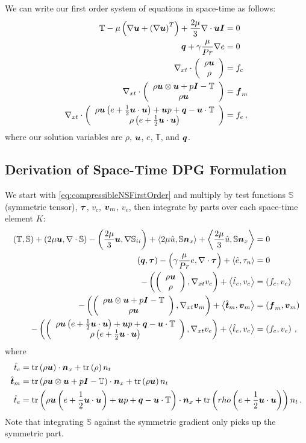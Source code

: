\documentclass[Proposal.tex]{subfiles}
\begin{document}
We can write our first order system of equations in space-time as follows:
\begin{subequations}
\label{eq:compressibleNSFirstOrder}
\begin{align}
	\mathbb{T}-\mu\LRp{\Grad\bfu+\LRp{\Grad\bfu}^T}+\frac{2\mu}{3}\Div\bfu\bfI&=0\\
	\bfq+\gamma\frac{\mu}{Pr}\Grad e&=0\\
	\Divxt\vecttwo{\rho\bfu}{\rho}&=f_c\\
	\Divxt\vecttwo{\rho\bfu\otimes\bfu+p\bfI-\mathbb{T}}{\rho\bfu}&=\bff_m\\
	\Divxt\vecttwo{\rho\bfu\LRp{e+\frac{1}{2}\bfu\cdot\bfu}+\bfu p+\bfq-\bfu\cdot\mathbb{T}}{\rho\LRp{e+\frac{1}{2}\bfu\cdot\bfu}}&=f_e\,,
\end{align}
\end{subequations}
where our solution variables are $\rho$, $\bfu$, $e$, $\mathbb{T}$, and $\bfq$.

\subsection{Derivation of Space-Time DPG Formulation}
We start with \eqref{eq:compressibleNSFirstOrder} and multiply by test functions $\mathbb{S}$ (symmetric tensor), $\bftau$, $v_c$, $\bfv_m$, $v_e$, 
then integrate by parts over each space-time element $K$:
\begin{subequations}
\label{eq:compressibleNSBF}
\begin{align}
	\LRp{\mathbb{T},\mathbb{S}}+\LRp{2\mu\bfu,\Div\mathbb{S}}-\LRp{\frac{2\mu}{3}\bfu,\Grad\mathbb{S}_{ii}}
	+\LRa{2\mu\hat u,\mathbb{S}\bfn_x}+\LRa{\frac{2\mu}{3}\hat u,\mathbb{S}\bfn_x}&=0\\
	\LRp{\bfq,\bftau}-\LRp{\gamma\frac{\mu}{Pr}e,\Div\bftau}+\LRa{\hat e,\tau_n}&=0\\
	-\LRp{\vecttwo{\rho\bfu}{\rho},\Gradxt v_c}+\LRa{\hat t_c,v_c}&=\LRp{f_c,v_c}\\
	-\LRp{\vecttwo{\rho\bfu\otimes\bfu+p\bfI-\mathbb{T}}{\rho\bfu},\Gradxt\bfv_m}+\LRa{\hat\bft_m,\bfv_m}&=\LRp{\bff_m,\bfv_m}\\
	-\LRp{\vecttwo{\rho\bfu\LRp{e+\frac{1}{2}\bfu\cdot\bfu}+\bfu p+\bfq-\bfu\cdot\mathbb{T}}{\rho\LRp{e+\frac{1}{2}\bfu\cdot\bfu}},\Gradxt v_e}
	+\LRa{\hat t_e,v_e}&=\LRp{f_e,v_e}\,,
\end{align}
\end{subequations}
where 
\begin{equation*}
\begin{aligned}
\hat t_c&=\trace\LRp{\rho\bfu}\cdot\bfn_x
+\trace\LRp{\rho}n_t\\
\hat\bft_m&=\trace\LRp{\rho\bfu\otimes\bfu+p\bfI-\mathbb{T}}\cdot\bfn_x
+\trace\LRp{\rho\bfu} n_t\\
\hat t_e&=\trace\LRp{\rho\bfu\LRp{e+\frac{1}{2}\bfu\cdot\bfu}+\bfu p+\bfq-\bfu\cdot\mathbb{T}}\cdot\bfn_x
+\trace\LRp{rho\LRp{e+\frac{1}{2}\bfu\cdot\bfu}}n_t\,.
\end{aligned}
\end{equation*}
Note that integrating $\mathbb{S}$ against the symmetric gradient only picks up the symmetric part.
\end{document}
